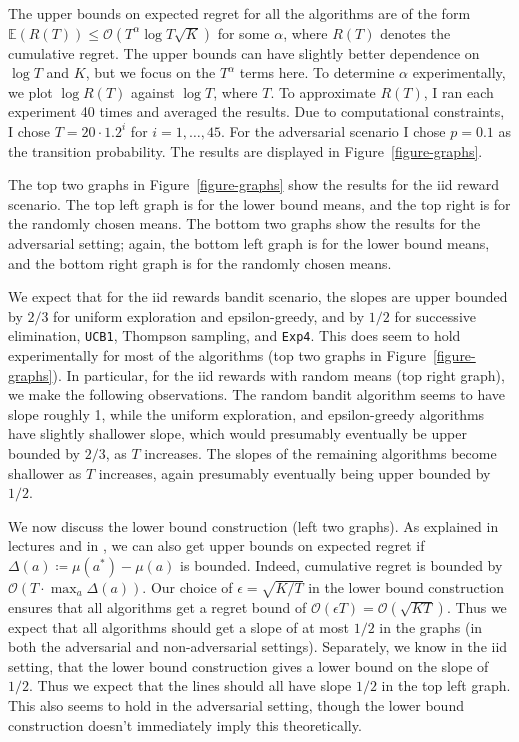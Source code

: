 \documentclass[10pt]{article}
\newcommand{\EE}{\mathbb{E}}
\newcommand{\bigoh}{\mathcal{O}}
\begin{document}
The upper bounds on expected regret for all the algorithms are of the form
$\EE(R(T)) \le \bigoh(T^\alpha \log T \sqrt{K})$ for some $\alpha$, where $R(T)$
denotes the cumulative regret. The upper bounds can have slightly better
dependence on $\log T$ and $K$, but we focus on the $T^\alpha$ terms here. To
determine $\alpha$ experimentally, we plot $\log R(T)$ against $\log T$, where
$T$. To approximate $R(T)$, I ran each experiment 40 times and averaged the
results. Due to computational constraints, I chose $T = 20 \cdot 1.2^i$ for $i =
1, \ldots, 45$. For the adversarial scenario I chose $p = 0.1$ as the transition
probability. The results are displayed in Figure~\ref{figure-graphs}.

The top two graphs in Figure~\ref{figure-graphs} show the results for the iid
reward scenario. The top left graph is for the lower bound means, and the top
right is for the randomly chosen means. The bottom two graphs show the results
for the adversarial setting; again, the bottom left graph is for the lower bound
means, and the bottom right graph is for the randomly chosen means.

We expect that for the iid rewards bandit scenario, the slopes are upper bounded
by $2/3$ for uniform exploration and epsilon-greedy, and by $1/2$ for successive
elimination, \verb'UCB1', Thompson sampling, and \verb'Exp4'. This does seem to
hold experimentally for most of the algorithms (top two graphs in
Figure~\ref{figure-graphs}). In particular, for the iid rewards with random
means (top right graph), we make the following observations. The random bandit
algorithm seems to have slope roughly 1, while the uniform exploration, and
epsilon-greedy algorithms have slightly shallower slope, which would presumably
eventually be upper bounded by $2/3$, as $T$ increases. The slopes of the
remaining algorithms become shallower as $T$ increases, again presumably
eventually being upper bounded by $1/2$.

We now discuss the lower bound construction (left two graphs). As explained in
lectures and in \cite{Slivkins}, we can also get upper bounds on expected regret
if $\Delta(a) \coloneqq \mu(a^*) - \mu(a)$ is bounded. Indeed, cumulative regret
is bounded by $\bigoh(T \cdot \max_a \Delta(a))$. Our choice of $\epsilon =
\sqrt{K/T}$ in the lower bound construction ensures that all algorithms get a
regret bound of $\bigoh(\epsilon T) = \bigoh(\sqrt{KT})$. Thus we expect that
all algorithms should get a slope of at most $1/2$ in the graphs (in both the
adversarial and non-adversarial settings). Separately, we know in the iid
setting, that the lower bound construction gives a lower bound on the slope of
$1/2$. Thus we expect that the lines should all have slope $1/2$ in the top left
graph. This also seems to hold in the adversarial setting, though the lower
bound construction doesn't immediately imply this theoretically.
\end{document}

